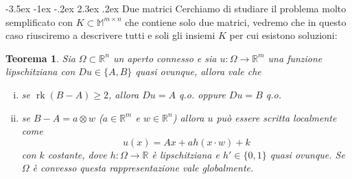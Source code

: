 \documentclass[a4paper,11pt]{book}
\makeatletter
\theoremstyle{plain}
\newtheorem{teo}{Teorema}[chapter]
\theoremstyle{definition}
\theoremstyle{remark}
\newcommand{\R}{\mathbb{R}}
\newcommand{\M}{\mathbb{M}}
\DeclareMathOperator{\rk}{rk}
\renewcommand\section{\@startsection {section}{1}{\z@}%
                                   {-3.5ex \@plus -1ex \@minus -.2ex}%
                                   {2.3ex \@plus.2ex}%
                                   {\normalfont\Large\bfseries}}
\makeatother
\begin{document}
\section{Due matrici}
Cerchiamo di studiare il problema molto semplificato con $K\subset\M^{m\times n}$ che contiene solo due matrici, vedremo che in questo caso riusciremo a descrivere tutti e soli gli insiemi $K$ per cui esistono soluzioni:
\begin{teo}\label{teo:1}
	Sia $\Omega\subset\R^n$ un aperto connesso e sia $u:\Omega\to\R^m$ una funzione lipschitziana con $Du\in\{A,B\}$ quasi ovunque, allora vale che
	\begin{enumerate}[i)]
		\item se $\rk(B-A)\geq 2$, allora $Du=A$ q.o. oppure $Du=B$ q.o.
		\item se $B-A=a\otimes w$ ($a\in\R^m$ e $w\in\R^n$) allora $u$ può essere scritta localmente come 
		\begin{equation}\label{eq:3}
		u(x) = Ax+ah(x\cdot w)+k
		\end{equation}
		con $k$ costante, dove $h:\Omega\to\R$ è lipschitziana e $h'\in \{0,1\}$ quasi ovunque. Se $\Omega$ è convesso questa rappresentazione vale globalmente.
	\end{enumerate}
\end{teo}
\end{document}
